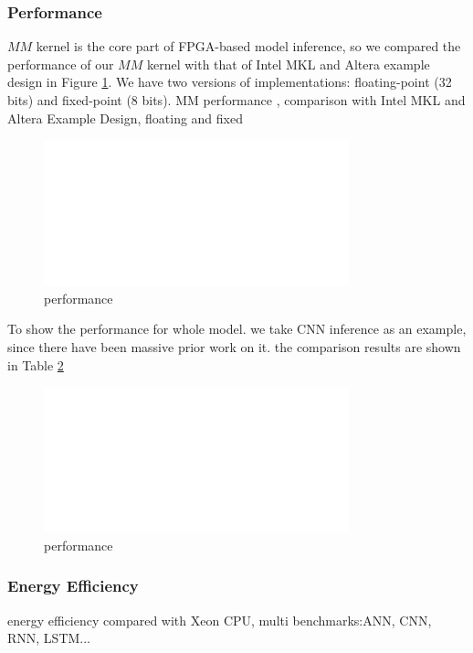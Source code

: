 \documentclass{acm_proc_article-sp-copy}
\begin{document}
\subsubsection{Performance}
$MM$ kernel is the core part of FPGA-based model inference, so we compared the performance of our $MM$ kernel with that of Intel MKL and Altera example design in Figure \ref{performance}. We have two versions of implementations: floating-point (32 bits) and fixed-point (8 bits).
MM performance , comparison with Intel MKL and Altera Example Design, floating and fixed
\begin{figure}
	\centering
	\includegraphics[width=1.0\linewidth]{./figure/blank.jpg}
	\caption{performance}
	\label{performance}
\end{figure}

To show the performance for whole model. we take CNN inference as an example, since there have been massive prior work on it. the comparison results are shown in Table \ref{cnn}
\begin{figure}
	\centering
	\includegraphics[width=1.0\linewidth]{./figure/blank.jpg}
	\caption{performance}
	\label{cnn}
\end{figure}

\subsubsection{Energy Efficiency}
energy efficiency compared with Xeon CPU, multi benchmarks:ANN, CNN, RNN, LSTM...
\end{document}

